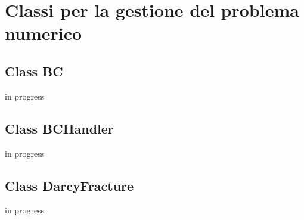 \chapter{Classi per la gestione del problema numerico}
\section{Class BC}

in progress

\section{Class BCHandler}

in progress

\section{Class DarcyFracture}

in progress

